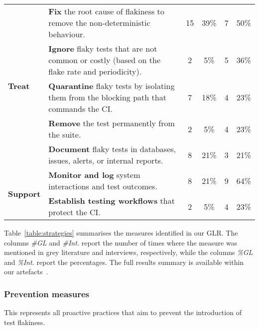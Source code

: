 \begin{table*}[htbp]
\begin{tabularx}{\textwidth}{lXcccc}
    \multirow{5}{*}{{\textbf{Treat}}} & \textbf{Fix} the root cause of flakiness to remove the non-deterministic behaviour. & 15 & 39\% & 7 & 50\% \\  %
    & \textbf{Ignore} flaky tests that are not common or costly (based on the flake rate and periodicity). & 2 & 5\% & 5 & 36\%\\  %
    & \textbf{Quarantine} flaky tests by isolating them from the blocking path that commands the CI. & 7 & 18\% & 4 & 23\% \\  %
    & \textbf{Remove} the test permanently from the suite. & 2 & 5\% & 4 & 23\% \\  %
    & \textbf{Document} flaky tests in databases, issues, alerts, or internal reports. & 8 & 21\% & 3 & 21\% \\  \hline
    
     \multirow{2}{*}{{\textbf{Support}}} & \textbf{Monitor and log} system interactions and test outcomes. & 8 & 21\% & 9 & 64\% \\  %
     & \textbf{Establish testing workflows} that protect the CI. & 2 & 5\% & 4 & 23\% \\ \hline
\end{tabularx}
\vspace{-0.7em}
\end{table*}
Table~\ref{table:strategies} summarises the measures identified in our GLR.
The columns \textit{\#GL} and \textit{\#Int.} report the number of times where the measure was mentioned in grey literature and interviews, respectively, while the columns \textit{\%GL} and \textit{\%Int.} report the percentages.
The full results summary is available within our artefacts~\cite{artefacts}.

\subsubsection{Prevention measures}
This represents all proactive practices that aim to prevent the introduction of test flakiness.

